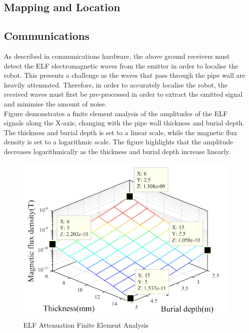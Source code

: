 \documentclass[11pt]{article}		%
\begin{document}
		\subsection{Mapping and Location}
		
		\subsection{Communications}
		
		As described in communications hardware, the above ground receivers must detect the ELF electromagnetic waves from the emitter in order to localise the robot. This presents a challenge as the waves that pass through the pipe wall are heavily attenuated. Therefore, in order to accurately localise the robot, the received waves must first be pre-processed in order to extract the emitted signal and minimise the amount of noise.\\ 
	    \hspace*{3ex}Figure  demonstrates a finite element analysis of the amplitudes of the ELF signals along the X-axis, changing with the pipe wall thickness and burial depth. The thickness and burial depth is set to a linear scale, while the magnetic flux density is set to a logarithmic scale. The figure highlights that the amplitude decreases logarithmically as the thickness and burial depth increase linearly.
	    
	    \begin{figure}[h]
			\centering
			\includegraphics[scale=1]{Attenuation.png}
			\caption{ELF Attenuation Finite Element Analysis}
			\label{comparisonComms}
		\end{figure}
\end{document}
